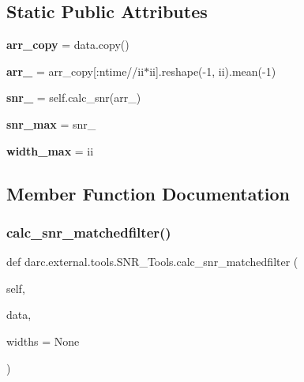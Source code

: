 \subsection*{Static Public Attributes}
\begin{DoxyCompactItemize}
\item 
\mbox{\label{classdarc_1_1external_1_1tools_1_1_s_n_r___tools_a138d86a18cce2734f8d9efa02efc60ec}} 
{\bfseries arr\+\_\+copy} = data.\+copy()
\item 
\mbox{\label{classdarc_1_1external_1_1tools_1_1_s_n_r___tools_a256f817a68af00c83f7a7574ea46f2bf}} 
{\bfseries arr\+\_\+} = arr\+\_\+copy\mbox{[}\+:ntime//ii$\ast$ii\mbox{]}.reshape(-\/1, ii).mean(-\/1)
\item 
\mbox{\label{classdarc_1_1external_1_1tools_1_1_s_n_r___tools_a63b3131f9dbc1d336bb4e2ddf8fe1a6a}} 
{\bfseries snr\+\_\+} = self.\+calc\+\_\+snr(arr\+\_\+)
\item 
\mbox{\label{classdarc_1_1external_1_1tools_1_1_s_n_r___tools_af5d449c302217f59e3646177c5f8ad9c}} 
{\bfseries snr\+\_\+max} = snr\+\_\+
\item 
\mbox{\label{classdarc_1_1external_1_1tools_1_1_s_n_r___tools_a065516ebacdf7a88f2abac869a28d516}} 
{\bfseries width\+\_\+max} = ii
\end{DoxyCompactItemize}


\subsection{Member Function Documentation}
\mbox{\label{classdarc_1_1external_1_1tools_1_1_s_n_r___tools_a97eef6fc596dc73dbe0b098aef56be99}} 
\subsubsection{\texorpdfstring{calc\_snr\_matchedfilter()}{calc\_snr\_matchedfilter()}}
{\footnotesize\ttfamily def darc.\+external.\+tools.\+S\+N\+R\+\_\+\+Tools.\+calc\+\_\+snr\+\_\+matchedfilter (\begin{DoxyParamCaption}\item[{}]{self,  }\item[{}]{data,  }\item[{}]{widths = {\ttfamily None} }\end{DoxyParamCaption})}

